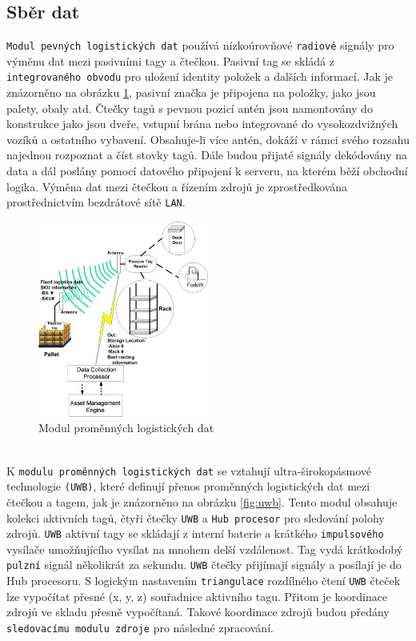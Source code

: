 \documentclass[czech,BP]{thesiskiv}
\begin{document}
\subsection{Sběr dat}
\texttt{Modul pevných logistických dat} používá nízkoúrovňové \texttt{radiové} signály pro výměnu dat mezi pasivními tagy a čtečkou. Pasivní tag se skládá z \texttt{integrovaného obvodu} pro uložení identity položek a dalších informací. Jak je znázorněno na obrázku \ref{fig:passive}, pasivní značka je připojena na položky, jako jsou palety, obaly atd. Čtečky tagů s pevnou pozicí antén jsou namontovány do konstrukce jako jsou dveře, vstupní brána nebo integrované do vysokozdvižných vozíků a ostatního vybavení. Obsahuje-li více antén, dokáží v rámci svého rozsahu najednou rozpoznat a číst stovky tagů. Dále budou přijaté signály dekódovány na data a dál poslány pomocí datového připojení k serveru, na kterém běží obchodní logika. Výměna dat mezi čtečkou a řízením zdrojů je zprostředkována prostřednictvím bezdrátové sítě \texttt{LAN}.\cite{chow2006design}

\begin{figure}[H]
		\centering
		\includegraphics[width=0.5\textwidth]{../images/passive.jpg}	
		\caption{Modul proměnných logistických dat\cite{chow2006design}}
		\label{fig:passive}
\end{figure}
\ \\
K \texttt{modulu proměnných logistických dat} se vztahují ultra-širokopásmové technologie \texttt{(UWB)}, které definují přenos proměnných logistických dat mezi čtečkou a tagem, jak je znázorněno na obrázku \ref{fig:uwb}. Tento modul obsahuje kolekci aktivních tagů, čtyři čtečky \texttt{UWB} a \texttt{Hub procesor} pro sledování polohy zdrojů. \texttt{UWB} aktivní tagy se skládají z interní baterie a krátkého \texttt{impulsového} vysílače umožňujícího vysílat na mnohem delší vzdálenost. Tag vydá krátkodobý \texttt{pulzní} signál několikrát za sekundu. \texttt{UWB} čtečky přijímají signály a posílají je do Hub procesoru. S logickým nastavením \texttt{triangulace} rozdílného čtení \texttt{UWB} čteček lze vypočítat přesné (x, y, z) souřadnice aktivního tagu. Přitom je koordinace zdrojů ve skladu přesně vypočítaná. Takové koordinace zdrojů budou předány \texttt{sledovacímu modulu zdroje} pro následné zpracování.\cite{chow2006design}
\end{document}
